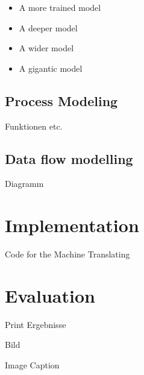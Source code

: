 \begin{itemize}
\item A more trained model
\item A deeper model
\item A wider model
\item A gigantic model
\end{itemize}

\subsection{Process Modeling}

Funktionen etc.

\subsection{Data flow modelling}

Diagramm

\section{Implementation}

Code for the Machine Translating

\section{Evaluation}

Print Ergebnisse

Bild

Image Caption